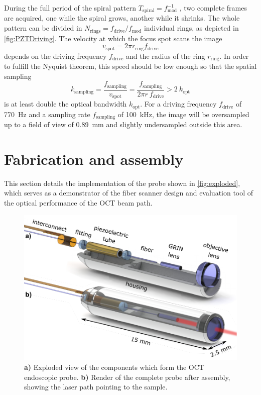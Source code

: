 \documentclass[10pt]{iopart}
\begin{document}
During the full period of the spiral pattern $T_\mathrm{spiral}=f_\mathrm{mod}^{-1}$ , two complete frames are acquired, one while the spiral grows, another while it shrinks. The whole pattern can be divided in $N_\mathrm{rings} = f_\mathrm{drive}/f_\mathrm{mod}$ individual rings, as depicted in \autoref{fig:PZTDriving}. The velocity at which the focus spot scans the image
\begin{equation}
v_\mathrm{spot} = 2 \pi r_\mathrm{ring} f_\mathrm{drive}
\end{equation}
depends on the driving frequency $f_\mathrm{drive}$ and the radius of the ring $r_\mathrm{ring}$. In order to fulfill the Nyquist theorem, this speed should be low enough so that the spatial sampling 
\begin{equation}
k_\mathrm{sampling} = \frac{f_\mathrm{sampling}}{v_\mathrm{spot}} = \frac{f_\mathrm{sampling}}{ 2\pi r \ f_\mathrm{drive}  }> 2\ k_\mathrm{opt}
\end{equation}
is at least double the optical bandwidth $k_\mathrm{opt}$. For a driving frequency $f_\mathrm{drive}$ of \SI{770}{\hertz} and a sampling rate 
$f_\mathrm{sampling} $ of \SI{100}{\kilo\hertz}, the image will be oversampled up to a field of view of \SI{0.89}{\milli\meter} and slightly undersampled outside this area.


\section{Fabrication and assembly}

This section details the implementation of the probe shown in \autoref{fig:exploded}, which serves as a demonstrator of the fiber scanner design and evaluation tool of the optical performance of the OCT beam path.

\begin{figure}[h!]\centering \includegraphics[width=\columnwidth]{figures/explodedRenderNames.pdf}
      \caption{\textbf{a)} Exploded view of the components which form the OCT endoscopic probe.
      \textbf{b)} Render of the complete probe after assembly, showing the laser path pointing to the sample.}
      \label{fig:exploded}
\end{figure}
\end{document}
